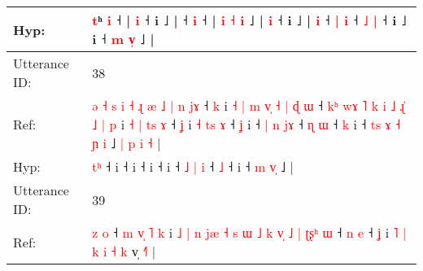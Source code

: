 \documentclass[10pt]{article}
\DeclareRobustCommand{\hl}[1]{{\textcolor{red}{#1}}}
\begin{document}
\begin{longtable}{ll}
 \\
Hyp: & \hl{}\hl{}\hl{}\hl{}\hl{}\hl{}\hl{t}ʰ \hl{}\hl{i} ˧\hl{}\hl{}\hl{}\hl{}\hl{}\hl{}\hl{}\hl{}\hl{}\hl{}\hl{}\hl{}\hl{}\hl{}\hl{}\hl{}\hl{}\hl{}\hl{}\hl{}\hl{}\hl{}\hl{}\hl{}\hl{} |\hl{}\hl{} \hl{i} ˧\hl{}\hl{}\hl{}\hl{}\hl{}\hl{}\hl{}\hl{}\hl{}\hl{} i ˩ |\hl{}\hl{}\hl{}\hl{} ˧\hl{}\hl{}\hl{} \hl{}\hl{i} ˧\hl{} |\hl{}\hl{}\hl{}\hl{}\hl{}\hl{}\hl{} \hl{i} \hl{˧} \hl{i} ˩\hl{}\hl{}\hl{}\hl{}\hl{}\hl{}\hl{} |\hl{}\hl{} \hl{i} ˧\hl{}\hl{}\hl{}\hl{}\hl{}\hl{}\hl{}\hl{}\hl{}\hl{} i ˩ | \hl{}\hl{i} ˧ \hl{}\hl{}\hl{|} \hl{i} ˧ \hl{˩} \hl{|} ˧\hl{}\hl{} i\hl{}\hl{}\hl{}\hl{}\hl{}\hl{}\hl{} ˩\hl{}\hl{}\hl{}\hl{}\hl{}\hl{}\hl{}\hl{} i ˧\hl{}\hl{}\hl{}\hl{} \hl{m} \hl{}\hl{v}\hl{̩} ˩ |
 \\
\midrule
Utterance ID: & 38 \\
Ref: & \hl{ə}\hl{ }\hl{˧}\hl{ }\hl{s}\hl{ }\hl{i}\hl{ }\hl{˧}\hl{ }\hl{ɻ}\hl{ }\hl{æ}\hl{ }\hl{˩}\hl{ }\hl{|}\hl{ }\hl{n}\hl{ }\hl{j}\hl{ɤ} ˧\hl{ }\hl{k} i\hl{ }\hl{˧}\hl{ }\hl{|}\hl{ }\hl{m}\hl{ }\hl{v}\hl{̩}\hl{ }\hl{˧}\hl{ }\hl{|}\hl{ }\hl{ɖ}\hl{ }\hl{ɯ} ˧\hl{ }\hl{k}\hl{ʰ}\hl{ }\hl{w}\hl{ɤ}\hl{ }\hl{˥}\hl{ }\hl{k}\hl{ }\hl{i}\hl{ }\hl{˩}\hl{ }\hl{ɻ}\hl{̍}\hl{ }\hl{˩}\hl{ }\hl{|}\hl{ }\hl{p} i\hl{ }\hl{˧}\hl{ }\hl{|}\hl{ }\hl{t}\hl{s}\hl{ }\hl{ɤ} ˧\hl{ }\hl{ʝ} i\hl{ }\hl{˧}\hl{ }\hl{t}\hl{s}\hl{ }\hl{ɤ} ˧\hl{ }\hl{ʝ} i ˧ \hl{|} \hl{n} \hl{j}\hl{ɤ} ˧\hl{ }\hl{ɳ} \hl{ɯ} ˧\hl{ }\hl{k} i ˧\hl{ }\hl{t}\hl{s}\hl{ }\hl{ɤ} \hl{˧} \hl{ɲ}\hl{ }\hl{i} ˩\hl{ }\hl{|}\hl{ }\hl{p}\hl{ }\hl{i}\hl{ }\hl{˧} |
 \\
Hyp: & \hl{}\hl{}\hl{}\hl{}\hl{}\hl{}\hl{}\hl{}\hl{}\hl{}\hl{}\hl{}\hl{}\hl{}\hl{}\hl{}\hl{}\hl{}\hl{}\hl{}\hl{t}\hl{ʰ} ˧\hl{}\hl{} i\hl{}\hl{}\hl{}\hl{}\hl{}\hl{}\hl{}\hl{}\hl{}\hl{}\hl{}\hl{}\hl{}\hl{}\hl{}\hl{}\hl{} ˧\hl{}\hl{}\hl{}\hl{}\hl{}\hl{}\hl{}\hl{}\hl{}\hl{}\hl{}\hl{}\hl{}\hl{}\hl{}\hl{}\hl{}\hl{}\hl{}\hl{}\hl{}\hl{}\hl{} i\hl{}\hl{}\hl{}\hl{}\hl{}\hl{}\hl{}\hl{}\hl{} ˧\hl{}\hl{} i\hl{}\hl{}\hl{}\hl{}\hl{}\hl{}\hl{} ˧\hl{}\hl{} i ˧ \hl{˩} \hl{|} \hl{}\hl{i} ˧\hl{}\hl{} \hl{˩} ˧\hl{}\hl{} i ˧\hl{}\hl{}\hl{}\hl{}\hl{} \hl{m} \hl{}\hl{v}\hl{̩} ˩\hl{}\hl{}\hl{}\hl{}\hl{}\hl{}\hl{}\hl{} |
 \\
\midrule
Utterance ID: & 39 \\
Ref: & \hl{z}\hl{ }\hl{o} ˧\hl{ }\hl{m}\hl{ }\hl{v}\hl{̩}\hl{ }\hl{˥}\hl{ }\hl{k} i\hl{ }\hl{˩}\hl{ }\hl{|}\hl{ }\hl{n}\hl{ }\hl{j}\hl{æ}\hl{ }\hl{˧}\hl{ }\hl{s}\hl{ }\hl{ɯ}\hl{ }\hl{˩}\hl{ }\hl{k}\hl{ }\hl{v}\hl{̩}\hl{ }\hl{˩}\hl{ }\hl{|}\hl{ }\hl{ʈ}\hl{ʂ}\hl{ʰ}\hl{ }\hl{ɯ} ˧\hl{ }\hl{n} \hl{e} ˧\hl{ }\hl{ʝ} i\hl{ }\hl{˥}\hl{ }\hl{|}\hl{ }\hl{k} \hl{i} \hl{˧} \hl{k} v̩ \hl{˧}\hl{˥} |

\end{longtable}
\end{document}
